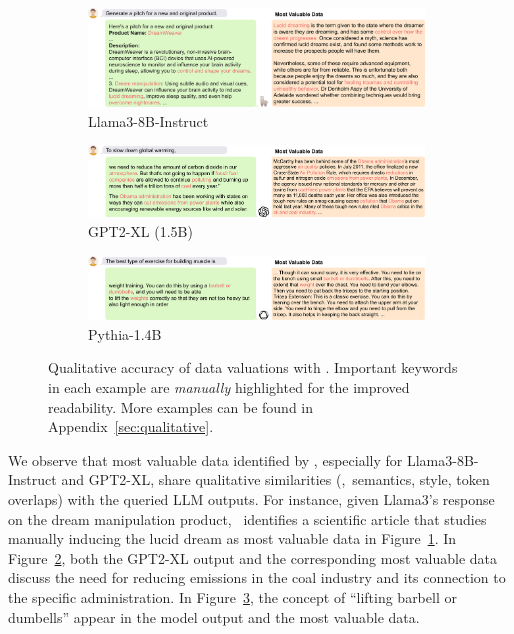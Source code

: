 \begin{figure}
    \centering
    \begin{subfigure}[b]{\textwidth}
        \centering
        \includegraphics[width=0.98\textwidth]{figures/llama.pdf}
        \vskip -3pt
        \caption{Llama3-8B-Instruct}
        \label{fig:llama3}
    \end{subfigure}

    \begin{subfigure}[b]{\textwidth}
        \centering
        \includegraphics[width=0.98\textwidth]{figures/gpt2-main.pdf}
        \vskip -3pt
        \caption{GPT2-XL (1.5B)}
        \label{fig:gpt2}
    \end{subfigure}

    \begin{subfigure}[b]{\textwidth}
        \centering
        \includegraphics[width=0.98\textwidth]{figures/pythia-main.pdf}
        \vskip -3pt
        \caption{Pythia-1.4B}
        \label{fig:pythia}
    \end{subfigure}

    \caption{Qualitative accuracy of data valuations with \method. Important keywords in each example are \textit{manually} highlighted for the improved readability. More examples can be found in Appendix~\ref{sec:qualitative}.}
    \label{fig:llm}
\end{figure}

We observe that most valuable data identified by \method, especially for Llama3-8B-Instruct and GPT2-XL, share qualitative similarities (\eg,\ semantics, style, token overlaps) with the queried LLM outputs. For instance, given Llama3's response on the dream manipulation product, \method\ identifies a scientific article that studies manually inducing the lucid dream as most valuable data in Figure~\ref{fig:llama3}. In Figure~\ref{fig:gpt2}, both the GPT2-XL output and the corresponding most valuable data discuss the need for reducing emissions in the coal industry and its connection to the specific administration. In Figure~\ref{fig:pythia}, the concept of ``lifting barbell or dumbells'' appear in the model output and the most valuable data. 

